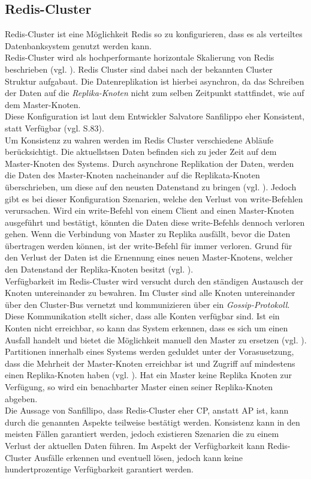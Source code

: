\subsection{Redis-Cluster}
Redis-Cluster ist eine Möglichkeit \acs{Redis} so zu konfigurieren, dass es als verteiltes Datenbanksystem genutzt werden kann. 
\\
Redis-Cluster wird als hochperformante horizontale Skalierung von Redis beschrieben (vgl. \cite{Redis-Cluster-Spec}). Redis Cluster sind dabei nach der bekannten Cluster Struktur aufgabaut. Die Datenreplikation ist hierbei asynchron, da das Schreiben der Daten auf die \textit{Replika-Knoten} nicht zum selben Zeitpunkt stattfindet, wie auf dem Master-Knoten.
\\
Diese Konfiguration ist laut dem Entwickler Salvatore Sanfilippo eher Konsistent, statt Verfügbar (vgl. \cite{nosql} S.83).
\\
Um Konsistenz zu wahren werden im Redis Cluster verschiedene Abläufe berücksichtigt. Die aktuellstsen Daten befinden sich zu jeder Zeit auf dem Master-Knoten des Systems. Durch asynchrone Replikation der Daten, werden die Daten des Master-Knoten nacheinander auf die Replikata-Knoten überschrieben, um diese auf den neusten Datenstand zu bringen (vgl. \cite{Redis-Cluster-Spec}).
Jedoch gibt es bei dieser Konfiguration Szenarien, welche den Verlust von write-Befehlen verursachen.
Wird ein write-Befehl von einem Client and einen Master-Knoten ausgeführt und bestätigt, könnten die Daten diese write-Befehls dennoch verloren gehen. Wenn die Verbindung von Master zu Replika ausfällt, bevor die Daten übertragen werden können, ist der write-Befehl für immer verloren. Grund für den Verlust der Daten ist die Ernennung eines neuen Master-Knotens, welcher den Datenstand der Replika-Knoten besitzt (vgl. \cite{Redis-Cluster-Spec}).
\\
Verfügbarkeit im Redis-Cluster wird versucht durch den ständigen Austausch der Knoten untereinander zu bewahren. Im Cluster sind alle Knoten untereinander über den Cluster-Bus vernetzt und kommunizieren über ein \textit{Gossip-Protokoll}. Diese Kommunikation stellt sicher, dass alle Konten verfügbar sind. Ist ein Konten nicht erreichbar, so kann das System erkennen, dass es sich um einen Ausfall handelt und bietet die Möglichkeit manuell den Master zu ersetzen (vgl. \cite{Redis-Cluster-Spec}).
\\
Partitionen innerhalb eines Systems werden geduldet unter der Vorasusetzung, dass die Mehrheit der Master-Knoten erreichbar ist und Zugriff auf mindestens einen Replika-Knoten haben (vgl. \cite{Redis-Cluster-Spec}). Hat ein Master keine Replika Knoten zur Verfügung, so wird ein benachbarter Master einen seiner Replika-Knoten abgeben.
\\
Die Aussage von Sanfillipo, dass Redis-Cluster eher CP, anstatt AP ist, kann durch die genannten Aspekte teilweise bestätigt werden. Konsistenz kann in den meisten Fällen garantiert werden, jedoch existieren Szenarien die zu einem Verlust der aktuellen Daten führen. Im Aspekt der Verfügbarkeit kann Redis-Cluster Ausfälle erkennen und eventuell lösen, jedoch kann keine hundertprozentige Verfügbarkeit garantiert werden.


